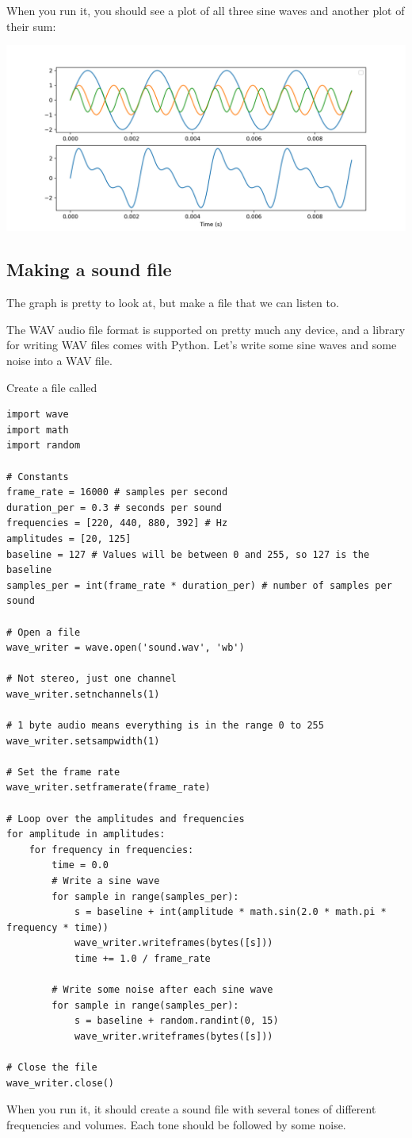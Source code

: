 When you run it, you should see a plot of all three sine waves and another plot of their sum:

\includegraphics[width=0.9\linewidth]{harmonicspy.png}

\subsection{Making a sound file}

The graph is pretty to look at, but make a file that we can listen to.

The WAV audio file format is supported on pretty much any device, and
a library for writing WAV files comes with Python. Let's write some
sine waves and some noise into a WAV file.

Create a file called 

\begin{Verbatim}
import wave
import math
import random

# Constants
frame_rate = 16000 # samples per second
duration_per = 0.3 # seconds per sound
frequencies = [220, 440, 880, 392] # Hz
amplitudes = [20, 125]
baseline = 127 # Values will be between 0 and 255, so 127 is the baseline
samples_per = int(frame_rate * duration_per) # number of samples per sound

# Open a file
wave_writer = wave.open('sound.wav', 'wb')

# Not stereo, just one channel
wave_writer.setnchannels(1)

# 1 byte audio means everything is in the range 0 to 255
wave_writer.setsampwidth(1)

# Set the frame rate
wave_writer.setframerate(frame_rate)

# Loop over the amplitudes and frequencies
for amplitude in amplitudes:
    for frequency in frequencies:
        time = 0.0
        # Write a sine wave
        for sample in range(samples_per):
            s = baseline + int(amplitude * math.sin(2.0 * math.pi * frequency * time))
            wave_writer.writeframes(bytes([s]))
            time += 1.0 / frame_rate
            
        # Write some noise after each sine wave
        for sample in range(samples_per):
            s = baseline + random.randint(0, 15)
            wave_writer.writeframes(bytes([s]))
            
# Close the file
wave_writer.close()
\end{Verbatim}

When you run it, it should create a sound file with several tones of
different frequencies and volumes. Each tone should be followed by
some noise.
